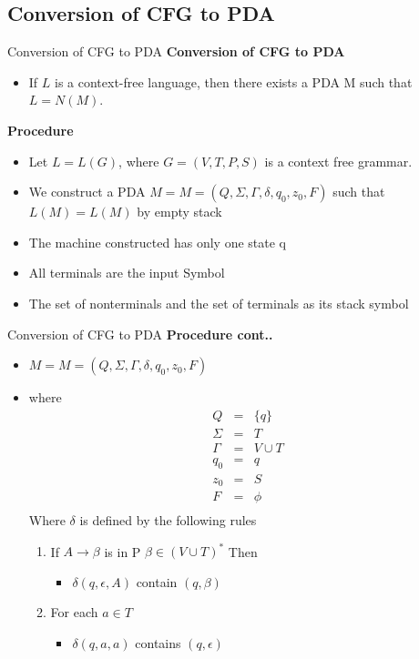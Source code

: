 \documentclass{beamer}
\begin{document}
\subsection{Conversion of CFG to PDA}
\begin{frame}{Conversion of CFG to PDA}
	\textbf{Conversion of CFG to PDA}
	\begin{itemize}
		\item If $L$ is a context-free language, then there exists a PDA M such that $L = N(M)$.
	\end{itemize}
\textbf{Procedure}
\begin{itemize}
	\item Let $L=L(G)$, where $G=(V, T,P,S)$ is a context free grammar. 
	\item We construct a PDA $M=M= (Q,\Sigma,\Gamma,\delta,q_0,z_0,F)$ such that $L(M)=L(M)$ by empty stack
	\item The machine constructed has only one state q
	\item All terminals are the input Symbol
	\item The set of nonterminals and the set of terminals as its stack symbol

\end{itemize}
\end{frame}
\begin{frame}{Conversion of CFG to PDA}
	\textbf{Procedure cont..}
	\small
	\begin{itemize}
		\item  $M=M= (Q,\Sigma,\Gamma,\delta,q_0,z_0,F)$ 
		\item where 
		\begin{eqnarray*}
			Q&=&\{q\}\\
			\Sigma&=&T\\
			\Gamma &=& V \cup T\\
			q_0&=&q\\
			z_0&=&S\\
			F&=&\phi\\
		\end{eqnarray*}
	Where $\delta$ is defined by the following rules	
	\begin{enumerate}
		\item If $A\rightarrow \beta$ is in P $\beta \in (V \cup T)^*$ Then 
		\begin{itemize}
			\item $\delta(q,\epsilon,A)$ contain $(q,\beta)$
		\end{itemize}
	\item For each $a\in T$
	\begin{itemize}
		\item $\delta(q,a,a)$ contains $(q,\epsilon)$
	\end{itemize}
	\end{enumerate}
	\end{itemize}
\end{frame}
\end{document}
